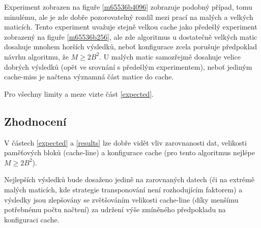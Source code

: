 \documentclass[a4paper,12pt]{article} %
\begin{document}
Experiment zobrazen na figuře \ref{m65536b4096} zobrazuje podobný případ, tomu minulému, ale je zde dobře pozorovatelný rozdíl mezi prací na malých a velkých maticích. Tento experiment uvažuje stejně velkou cache jako předešlý experiment zobrazený na figuře \ref{m65536b256}, ale zde algoritmus u dostatečně velkých matic dosahuje mnohem horších výsledků, neboť konfigurace zcela porušuje předpoklad návrhu algoritmu, že $M \geq 2 B^2$. U malých matic samozřejmě dosahuje velice dobrých výsledků (opět ve srovnání s předešlým experimentem), neboť jediným cache-miss je načtena významná část matice do cache.

Pro všechny limity a meze vizte část \ref{expected}.

\subsection{Zhodnocení}

V částech \ref{expected} a \ref{results} lze dobře vidět vliv zarovnanosti dat, velikosti paměťových bloků (cache-line) a konfigurace cache (pro tento algoritmus nejlépe $M \geq 2 B^2$).

Nejlepších výsledků bude dosaženo jedině na zarovnaných datech (či na extrémě malých maticích, kde strategie transponování není rozhodujícím faktorem) a výsledky jsou zlepšovány se zvětšováním velikosti cache-line (díky menšímu potřebnému počtu načtení) za udržení výše zmíněného předpokladu na konfiguraci cache.
\end{document}

